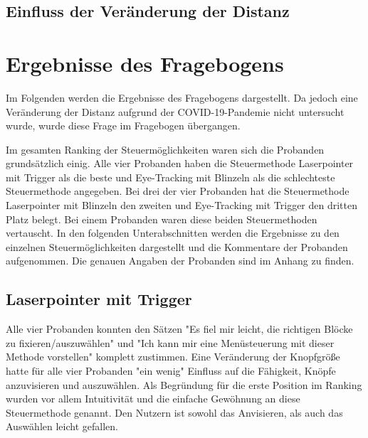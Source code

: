 \subsection{Einfluss der Veränderung der Distanz}
\section{Ergebnisse des Fragebogens}
Im Folgenden werden die Ergebnisse des Fragebogens dargestellt. Da jedoch eine Veränderung der Distanz aufgrund der COVID-19-Pandemie nicht untersucht wurde, wurde diese Frage im Fragebogen übergangen. 

Im gesamten Ranking der Steuermöglichkeiten waren sich die Probanden grundsätzlich einig. Alle vier Probanden haben die Steuermethode Laserpointer mit Trigger als die beste und Eye-Tracking mit Blinzeln als die schlechteste Steuermethode angegeben. Bei drei der vier Probanden hat die Steuermethode Laserpointer mit Blinzeln den zweiten und Eye-Tracking mit Trigger den dritten Platz belegt. Bei einem Probanden waren diese beiden Steuermethoden vertauscht. In den folgenden Unterabschnitten werden die Ergebnisse zu den einzelnen Steuermöglichkeiten dargestellt und die Kommentare der Probanden aufgenommen. Die genauen Angaben der Probanden sind im Anhang  zu finden.
\subsection{Laserpointer mit Trigger}
Alle vier Probanden konnten den Sätzen "Es fiel mir leicht, die richtigen Blöcke zu fixieren/auszuwählen" und "Ich kann mir eine Menüsteuerung mit dieser Methode vorstellen" komplett zustimmen. Eine Veränderung der Knopfgröße hatte für alle vier Probanden "ein wenig" Einfluss auf die Fähigkeit, Knöpfe anzuvisieren und auszuwählen. Als Begründung für die erste Position im Ranking wurden vor allem Intuitivität und die einfache Gewöhnung an diese Steuermethode genannt. Den Nutzern ist sowohl das Anvisieren, als auch das Auswählen leicht gefallen. 
